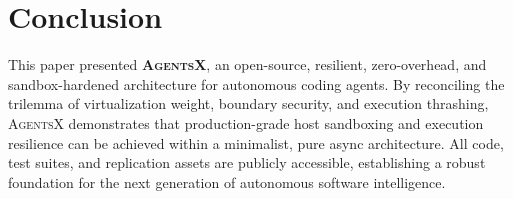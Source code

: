 \documentclass[10pt,twocolumn,letterpaper]{article}
\begin{document}
\section{Conclusion}
\label{sec:conclusion}

This paper presented \textbf{\textsc{AgentsX}}, an open-source, resilient, zero-overhead, and sandbox-hardened architecture for autonomous coding agents. By reconciling the trilemma of virtualization weight, boundary security, and execution thrashing, \textsc{AgentsX} demonstrates that production-grade host sandboxing and execution resilience can be achieved within a minimalist, pure async architecture. All code, test suites, and replication assets are publicly accessible, establishing a robust foundation for the next generation of autonomous software intelligence.



\end{document}
